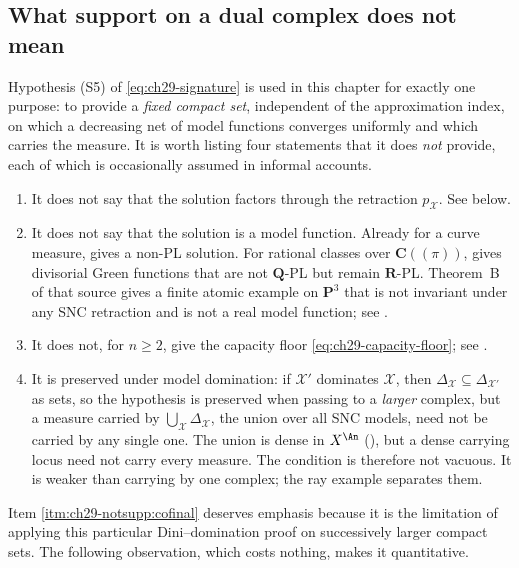 \subsection{What support on a dual complex does not mean}
\label{sec:ch29-support-not}

Hypothesis \textup{(S5)} of \eqref{eq:ch29-signature} is used in this
chapter for exactly one purpose: to provide a \emph{fixed compact set},
independent of the approximation index, on which a decreasing net of model
functions converges uniformly and which carries the measure.  It is worth
listing four statements that it does \emph{not} provide, each of which is
occasionally assumed in informal accounts.

\begin{enumerate}
\item\label{itm:ch29-notsupp:factor}
 It does not say that the solution factors through the retraction
 $p_{\mathcal X}$.  See  below.
\item\label{itm:ch29-notsupp:model}
 It does not say that the solution is a model function.  Already for a
 curve measure,  gives a non-PL solution.
 For rational classes over $\mathbf C(\!(\pi)\!)$,
 \cite[Theorem~A(ii)]{BJGreen24} gives divisorial Green functions that
 are not $\mathbf Q$-PL but remain $\mathbf R$-PL.  Theorem~B of that
 source gives a finite atomic example on $\mathbf P^3$ that is not
 invariant under any SNC retraction and is not a real model function;
 see .
\item\label{itm:ch29-notsupp:floor}
 It does not, for $n\geq2$, give the capacity floor
 \eqref{eq:ch29-capacity-floor}; see .
\item\label{itm:ch29-notsupp:cofinal}
 It is preserved under model domination: if
 $\mathcal X'$ dominates $\mathcal X$, then
 $\Delta_{\mathcal X}\subseteq\Delta_{\mathcal X'}$ as sets, so the
 hypothesis is preserved when passing to a \emph{larger} complex, but a
 measure carried by $\bigcup_{\mathcal X}\Delta_{\mathcal X}$, the union
 over all SNC models, need not be carried by any single one.  The union is dense in $X^{\An}$
 (), but a dense carrying locus need not carry
 every measure.  The condition is therefore not vacuous.  It is weaker
 than carrying by one complex; the ray example
  separates them.
\end{enumerate}

Item \cref{itm:ch29-notsupp:cofinal} deserves emphasis because it is the
limitation of applying this particular Dini--domination proof on
successively larger compact sets.
The following observation, which costs nothing, makes it quantitative.

